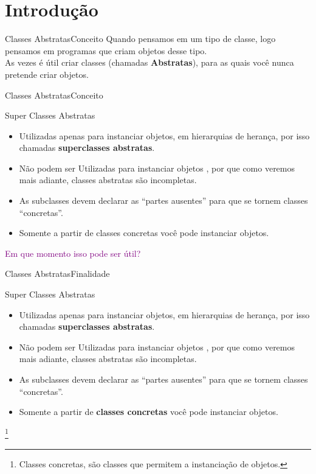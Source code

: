 \documentclass[11pt,aspectratio=43,ignorenonframetext,t]{beamer}
\begin{document}
\section{Introdução}
\begin{frame}{Classes Abstratas}{Conceito}
  Quando pensamos em um tipo de classe, logo pensamos em programas que criam objetos desse tipo.\\
As vezes é útil criar classes (chamadas \textbf{Abstratas}), para as 
quais você nunca pretende criar objetos.\\

\end{frame}
\begin{frame}{Classes Abstratas}{Conceito}
  \begin{block}{Super Classes Abstratas}
    \begin{itemize}
     \item Utilizadas apenas para instanciar objetos, em hierarquias de 
herança, por isso chamadas \textbf{superclasses abstratas}.
      \item Não podem ser Utilizadas para instanciar objetos , por que como 
veremos mais adiante, classes abstratas são incompletas.
      \item As subclasses devem declarar as ``partes ausentes'' para que se 
tornem classes ``concretas''.
      \item Somente a partir de classes concretas você pode instanciar objetos.
    \end{itemize}

  \end{block}
  \textcolor{purple}{Em que momento isso pode ser útil?}
\end{frame}
\begin{frame}{Classes Abstratas}{Finalidade}
  \begin{block}{Super Classes Abstratas}
    \begin{itemize}
     \item Utilizadas apenas para instanciar objetos, em hierarquias de 
herança, por isso chamadas \textbf{superclasses abstratas}.
      \item Não podem ser Utilizadas para instanciar objetos , por que como 
veremos mais adiante, classes abstratas são incompletas.
      \item As subclasses devem declarar as ``partes ausentes'' para que se 
tornem classes ``concretas''.
      \item Somente a partir de \textbf{classes 
concretas\tiny{\footnotemark[1]}} você pode instanciar objetos.
    \end{itemize}
  \end{block}
  \tiny{\footnote{Classes concretas, são classes que permitem a instanciação de 
      objetos.}}
\end{frame}
\end{document}
